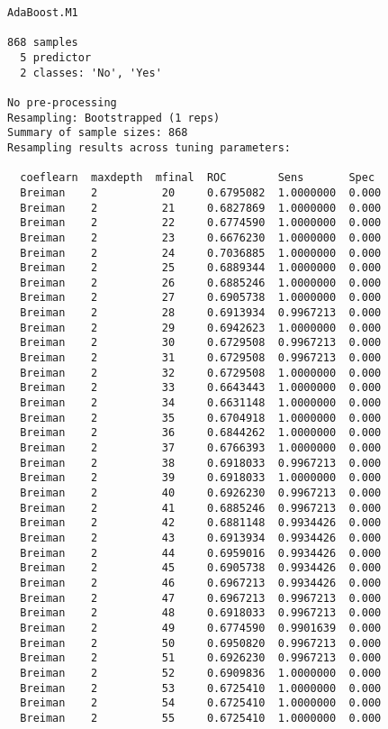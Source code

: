 \documentclass[11pt]{article}
\begin{document}
    \begin{Verbatim}[commandchars=\\\{\}]
AdaBoost.M1 

868 samples
  5 predictor
  2 classes: 'No', 'Yes' 

No pre-processing
Resampling: Bootstrapped (1 reps) 
Summary of sample sizes: 868 
Resampling results across tuning parameters:

  coeflearn  maxdepth  mfinal  ROC        Sens       Spec 
  Breiman    2          20     0.6795082  1.0000000  0.000
  Breiman    2          21     0.6827869  1.0000000  0.000
  Breiman    2          22     0.6774590  1.0000000  0.000
  Breiman    2          23     0.6676230  1.0000000  0.000
  Breiman    2          24     0.7036885  1.0000000  0.000
  Breiman    2          25     0.6889344  1.0000000  0.000
  Breiman    2          26     0.6885246  1.0000000  0.000
  Breiman    2          27     0.6905738  1.0000000  0.000
  Breiman    2          28     0.6913934  0.9967213  0.000
  Breiman    2          29     0.6942623  1.0000000  0.000
  Breiman    2          30     0.6729508  0.9967213  0.000
  Breiman    2          31     0.6729508  0.9967213  0.000
  Breiman    2          32     0.6729508  1.0000000  0.000
  Breiman    2          33     0.6643443  1.0000000  0.000
  Breiman    2          34     0.6631148  1.0000000  0.000
  Breiman    2          35     0.6704918  1.0000000  0.000
  Breiman    2          36     0.6844262  1.0000000  0.000
  Breiman    2          37     0.6766393  1.0000000  0.000
  Breiman    2          38     0.6918033  0.9967213  0.000
  Breiman    2          39     0.6918033  1.0000000  0.000
  Breiman    2          40     0.6926230  0.9967213  0.000
  Breiman    2          41     0.6885246  0.9967213  0.000
  Breiman    2          42     0.6881148  0.9934426  0.000
  Breiman    2          43     0.6913934  0.9934426  0.000
  Breiman    2          44     0.6959016  0.9934426  0.000
  Breiman    2          45     0.6905738  0.9934426  0.000
  Breiman    2          46     0.6967213  0.9934426  0.000
  Breiman    2          47     0.6967213  0.9967213  0.000
  Breiman    2          48     0.6918033  0.9967213  0.000
  Breiman    2          49     0.6774590  0.9901639  0.000
  Breiman    2          50     0.6950820  0.9967213  0.000
  Breiman    2          51     0.6926230  0.9967213  0.000
  Breiman    2          52     0.6909836  1.0000000  0.000
  Breiman    2          53     0.6725410  1.0000000  0.000
  Breiman    2          54     0.6725410  1.0000000  0.000
  Breiman    2          55     0.6725410  1.0000000  0.000

\end{Verbatim}
\end{document}

